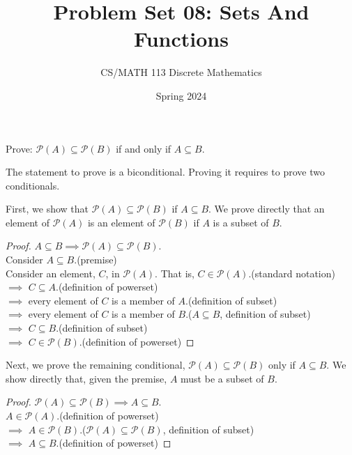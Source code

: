 \documentclass[a4paper]{exam}
\title{Problem Set 08: Sets And Functions}
\author{CS/MATH 113 Discrete Mathematics}
\date{Spring 2024}
\theoremstyle{definition}
\begin{document}
\maketitle

\begin{questions}
\question 
  Prove: $\mathcal{P}(A) \subseteq \mathcal{P}(B)$ if and only if $A \subseteq B$.

  \begin{solution}
    The statement to prove is a biconditional. Proving it requires to prove two conditionals.

    First, we show that $\mathcal{P}(A) \subseteq \mathcal{P}(B)$ if $A \subseteq B$. We prove directly that an element of $\mathcal{P}(A)$ is an element of $\mathcal{P}(B)$ if $A$ is a subset of $B$.
    
    \begin{proof}$A \subseteq B \implies \mathcal{P}(A) \subseteq \mathcal{P}(B)$.\\
      Consider $A \subseteq B$.\hfill (premise)\\
      Consider an element, $C$, in $\mathcal{P}(A)$. That is, $C \in \mathcal{P}(A)$.\hfill(standard notation)\\
      $\implies$ $C\subseteq A$.\hfill(definition of powerset)\\
      $\implies$ every element of $C$ is a member of $A$.\hfill(definition of subset)\\
      $\implies$ every element of $C$ is a member of $B$.\hfill($A\subseteq B$, definition of subset)\\
      $\implies$ $C\subseteq B$.\hfill(definition of subset)\\
      $\implies$ $C\in \mathcal{P}(B)$.\hfill(definition of powerset)
    \end{proof}

    Next, we prove the remaining conditional, $\mathcal{P}(A) \subseteq \mathcal{P}(B)$ only if $A \subseteq B$. We show directly that, given the premise, $A$ must be a subset of $B$.
    
    \begin{proof}$\mathcal{P}(A) \subseteq \mathcal{P}(B)\implies A \subseteq B$.\\
      $A \in \mathcal{P}(A)$.\hfill (definition of powerset)\\
      $\implies$ $A \in \mathcal{P}(B)$.\hfill ($\mathcal{P}(A) \subseteq \mathcal{P}(B)$, definition of subset)\\
      $\implies$ $A \subseteq B$.\hfill (definition of powerset)
    \end{proof}
  \end{solution}


\end{questions}
\end{document}
